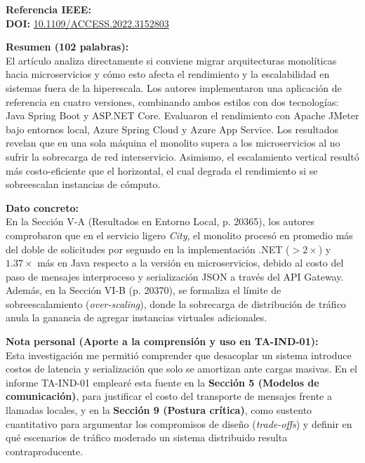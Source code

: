 \documentclass[11pt,a4paper]{article}
\begin{document}
\begin{tcolorbox}[colback=white,colframe=black!75!black,title=\textbf{Ficha Bibliográfica 1: Artículo Indexado (IEEE Access)}]
\textbf{Referencia IEEE:} \cite{ref1_monolithic} \\
\textbf{DOI:} \href{https://doi.org/10.1109/ACCESS.2022.3152803}{10.1109/ACCESS.2022.3152803}

\vspace{0.2cm}
\textbf{Resumen (102 palabras):} \\
El artículo analiza directamente si conviene migrar arquitecturas monolíticas hacia microservicios y cómo esto afecta el rendimiento y la escalabilidad en sistemas fuera de la hiperescala. Los autores implementaron una aplicación de referencia en cuatro versiones, combinando ambos estilos con dos tecnologías: Java Spring Boot y ASP.NET Core. Evaluaron el rendimiento con Apache JMeter bajo entornos local, Azure Spring Cloud y Azure App Service. Los resultados revelan que en una sola máquina el monolito supera a los microservicios al no sufrir la sobrecarga de red interservicio. Asimismo, el escalamiento vertical resultó más costo-eficiente que el horizontal, el cual degrada el rendimiento si se sobreescalan instancias de cómputo.

\vspace{0.2cm}
\textbf{Dato concreto:} \\
En la Sección V-A (Resultados en Entorno Local, p. 20365), los autores comprobaron que en el servicio ligero \textit{City}, el monolito procesó en promedio más del doble de solicitudes por segundo en la implementación .NET ($>2\times$) y $1.37\times$ más en Java respecto a la versión en microservicios, debido al costo del paso de mensajes interproceso y serialización JSON a través del API Gateway. Además, en la Sección VI-B (p. 20370), se formaliza el límite de sobreescalamiento (\textit{over-scaling}), donde la sobrecarga de distribución de tráfico anula la ganancia de agregar instancias virtuales adicionales.

\vspace{0.2cm}
\textbf{Nota personal (Aporte a la comprensión y uso en TA-IND-01):} \\
Esta investigación me permitió comprender que desacoplar un sistema introduce costos de latencia y serialización que solo se amortizan ante cargas masivas. En el informe TA-IND-01 emplearé esta fuente en la \textbf{Sección 5 (Modelos de comunicación)}, para justificar el costo del transporte de mensajes frente a llamadas locales, y en la \textbf{Sección 9 (Postura crítica)}, como sustento cuantitativo para argumentar los compromisos de diseño (\textit{trade-offs}) y definir en qué escenarios de tráfico moderado un sistema distribuido resulta contraproducente.
\end{tcolorbox}
\end{document}

